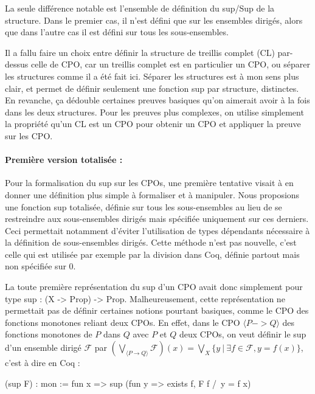 \documentclass{article}
\newcommand\code[1]{{\fontfamily{lmtt}\selectfont #1}}
\theoremstyle{definition}
\begin{document}
La seule différence notable est l'ensemble de définition du sup/Sup de la structure. Dans le premier cas, il n'est défini que sur les ensembles dirigés, alors que dans l'autre cas il est défini sur tous les sous-ensembles. 

Il a fallu faire un choix entre définir la structure de treillis complet (CL) par-dessus celle de CPO, car un treillis complet est en particulier un CPO, ou séparer les structures comme il a été fait ici. Séparer les structures est à mon sens plus clair, et permet de définir seulement une fonction sup par structure, distinctes. En revanche, ça dédouble certaines preuves basiques qu'on aimerait avoir à la fois dans les deux structures. Pour les preuves plus complexes, on utilise simplement la propriété qu'un CL est un CPO pour obtenir un CPO et appliquer la preuve sur les CPO.

\medskip

\paragraph{Première version totalisée :\\}
\label{simplicite}
Pour la formalisation du sup sur les CPOs, une première tentative visait à en donner une définition plus simple à formaliser et à manipuler. Nous proposions une fonction sup totalisée, définie sur tous les sous-ensembles au lieu de se restreindre aux sous-ensembles dirigés mais spécifiée uniquement sur ces derniers. Ceci permettait notamment d'éviter l'utilisation de types dépendants nécessaire à la définition de sous-ensembles dirigés. Cette méthode n'est pas nouvelle, c'est celle qui est utilisée par exemple par la division dans Coq, définie partout mais non spécifiée sur $0$. 

La toute première représentation du sup d'un CPO avait donc simplement pour type \code{sup : (X -> Prop) -> Prop}. Malheureusement, cette représentation ne permettait pas de définir certaines notions pourtant basiques, comme le CPO des fonctions monotones reliant deux CPOs. En effet, dans le CPO $\langle P -> Q \rangle$ des fonctions monotones de $P$ dans $Q$ avec $P$ et $Q$ deux CPOs, on veut définir le sup d'un ensemble dirigé $\mathcal{F}$ par $(\bigvee_{\langle P \rightarrow Q \rangle} \mathcal{F})(x) = \bigvee_{X} \{y ~ | ~ \exists f \in \mathcal{F}, y = f(x)\}$, c'est à dire en Coq :

\begin{coq}
(sup F) : mon := fun x => sup (fun y => exists f, F f /\ y = f x)
\end{coq}
\end{document}
